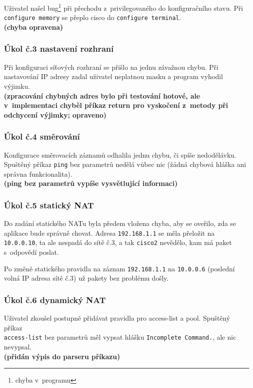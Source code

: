 Uživatel našel bug\footnote{chyba v~programu} při přechodu z~privilegovaného do konfiguračního stavu. Při \\\verb|configure memory| se přeplo cisco do \verb|configure terminal|.
\\\textbf{(chyba opravena)}

\subsubsection{Úkol č.3 nastavení rozhraní}
Při konfiguraci síťových rozhraní se přišlo na jednu závažnou chybu. Při nastavování IP adresy zadal uživatel neplatnou masku a program vyhodil výjimku.
\\\textbf{(zpracování chybných adres bylo při testování hotové, ale v~implementaci chyběl příkaz return pro vyskočení z~metody při odchycení výjimky; opraveno)}

\subsubsection{Úkol č.4 směrování}
Konfigurace směrovacích záznamů odhalila jednu chybu, či spíše nedodělávku. Spuštěný příkaz \verb|ping| bez parametrů nedělá vůbec nic (žádná chybová hláška ani správna funkcionalita).
\\\textbf{(ping bez parametrů vypíše vysvětlující informaci)}

\subsubsection{Úkol č.5 statický NAT}
Do zadání statického NATu byla předem vložena chyba, aby se oveřilo, zda se aplikace bude správně chovat. Adresa \verb|192.168.1.1| se měla přeložit na \verb|10.0.0.10|, ta ale nespadá do sítě č.3, a tak \verb|cisco2| nevědělo, kam má paket s~odpovědí poslat.

Po změně statického pravidla na záznam \verb|192.168.1.1| na \verb|10.0.0.6| (poslední volná IP adresa sítě č.3) už pakety bez problému došly.

\subsubsection{Úkol č.6 dynamický NAT}
Uživatel zkoušel postupně přidávat pravidla pro access-list a pool. Spuštěný příkaz \\\verb|access-list| bez parametrů měl vypsat hlášku \verb|Incomplete Command.|, ale nic nevypsal.
\\\textbf{(přidán výpis do parseru příkazu)}

